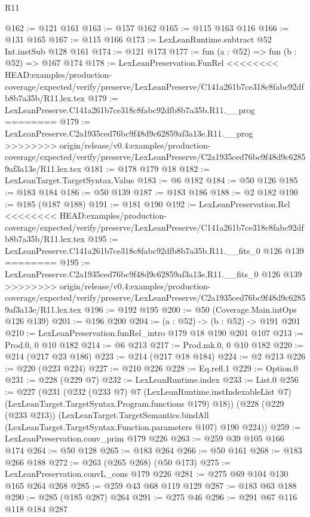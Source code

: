 \begin{lexlean}{R11}
\begin{coremodule}
{{{{{@162 := @121 @161
@163 := @157 @162
@165 := @115 @163 @116
@166 := @131 @165
@167 := @115 @166
@173 := LexLeanRuntime.subtract @52 Int.instSub @128 @161
@174 := @121 @173
@177 := fun (a : @52) => fun (b : @52) => @167 @174
@178 := LexLeanPreservation.FunRel
<<<<<<<< HEAD:examples/production-coverage/expected/verify/preserve/LexLeanPreserve/C141a261b7ce318c8fabc92dfb8b7a35b/R11.lex.tex
@179 := LexLeanPreserve.C141a261b7ce318c8fabc92dfb8b7a35b.R11.__prog
========
@179 := LexLeanPreserve.C2a1935ced76bc9f48d9c62859af3a13e.R11.__prog
>>>>>>>> origin/release/v0.4:examples/production-coverage/expected/verify/preserve/LexLeanPreserve/C2a1935ced76bc9f48d9c62859af3a13e/R11.lex.tex
@181 := @178 @179 @18
@182 := LexLeanTarget.TargetSyntax.Value
@183 := @6 @182
@184 := @50 @126
@185 := @183 @184
@186 := @50 @139
@187 := @183 @186
@188 := @2 @182
@190 := @185 (@187 @188)
@191 := @181 @190
@192 := LexLeanPreservation.Rel
<<<<<<<< HEAD:examples/production-coverage/expected/verify/preserve/LexLeanPreserve/C141a261b7ce318c8fabc92dfb8b7a35b/R11.lex.tex
@195 := LexLeanPreserve.C141a261b7ce318c8fabc92dfb8b7a35b.R11.__fits_0 @126 @139
========
@195 := LexLeanPreserve.C2a1935ced76bc9f48d9c62859af3a13e.R11.__fits_0 @126 @139
>>>>>>>> origin/release/v0.4:examples/production-coverage/expected/verify/preserve/LexLeanPreserve/C2a1935ced76bc9f48d9c62859af3a13e/R11.lex.tex
@196 := @192 @195
@200 := @50 (Coverage.Main.intOps @126 @139)
@201 := @196 @200
@204 := (a : @52) -> (b : @52) -> @191 @201
@210 := LexLeanPreservation.funRel_intro @179 @18 @190 @201 @107
@213 := Prod.{0, 0} @10 @182
@214 := @6 @213
@217 := Prod.mk.{0, 0} @10 @182
@220 := @214 (@217 @23 @186)
@223 := @214 (@217 @18 @184)
@224 := @2 @213
@226 := @220 (@223 @224)
@227 := @210 @226
@228 := Eq.refl.{1}
@229 := Option.{0}
@231 := @228 (@229 @7)
@232 := LexLeanRuntime.index
@233 := List.{0}
@256 := @227
    (@231
      (@232
        (@233 @7)
        @7
        (LexLeanRuntime.instIndexableList @7)
        (LexLeanTarget.TargetSyntax.Program.functions @179)
        @18))
    (@228
      (@229 (@233 @213))
      (LexLeanTarget.TargetSemantics.bindAll
        (LexLeanTarget.TargetSyntax.Function.parameters @107)
        @190
        @224))
@259 := LexLeanPreservation.conv_prim @179 @226
@263 := @259 @39 @105 @166 @174
@264 := @50 @128
@265 := @183 @264
@266 := @50 @161
@268 := @183 @266 @188
@272 := @263 (@265 @268) (@50 @173)
@275 := LexLeanPreservation.convL_cons @179 @226
@281 := @275 @69 @104 @130 @165 @264 @268
@285 := @259 @43 @68 @119 @129
@287 := @183 @63 @188
@290 := @285 (@185 @287) @264
@291 := @275 @46
@296 := @291 @67 @116 @118 @184 @287
}}}}}
\end{coremodule}
\end{lexlean}
